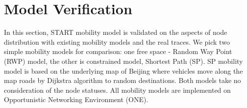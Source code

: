 \section{Model Verification}
\label{section_model_varification}


In this section, START mobility model is validated on the aspects of node distribution with existing mobility models and the real traces. We pick two simple mobility models for comparison: one free space - Random Way Point (RWP) model, the other is constrained model, Shortest Path (SP).  SP mobility model is based on the underlying map of Beijing where vehicles move along the map roads by Dijkstra algorithm to random destinations. Both models take no consideration of the node statuses. All mobility models are implemented on Opportunistic Networking Environment (ONE)\cite{KeranenOtt-155}.

